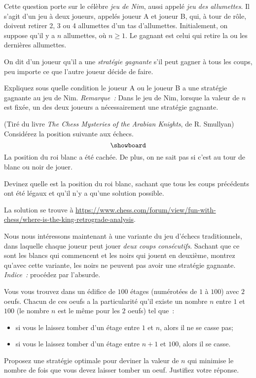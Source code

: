 \documentclass[12pt,addpoints]{exam}
\begin{document}
\begin{questions}

\question
Cette question porte sur le célèbre \emph{jeu de Nim}, aussi appelé \emph{jeu des allumettes}. Il s'agit d'un jeu à deux joueurs, appelés joueur A et joueur B, qui, à tour de rôle, doivent retirer 2, 3 ou 4 allumettes d'un tas d'allumettes. Initialement, on suppose qu'il y a $n$ allumettes, où $n \geq 1$. Le gagnant est celui qui retire la ou les dernières allumettes.

On dit d'un joueur qu'il a une \emph{stratégie gagnante} s'il peut gagner à tous les coups, peu importe ce que l'autre joueur décide de faire.

Expliquez sous quelle condition le joueur A ou le joueur B a une stratégie gagnante au jeu de Nim. \emph{Remarque~:} Dans le jeu de Nim, lorsque la valeur de $n$ est fixée, un des deux joueurs a nécessairement une stratégie gagnante.

\question
(Tiré du livre \emph{The Chess Mysteries of the Arabian Knights}, de R. Smullyan) Considérez la position suivante aux échecs.
\[ \showboard \]
La position du roi blanc a été cachée. De plus, on ne sait pas si c'est au tour de blanc ou noir de jouer.

Devinez quelle est la position du roi blanc, sachant que tous les coups précédents ont été légaux et qu'il n'y a qu'une solution possible.
\begin{solution}
La solution se trouve à \href{https://www.chess.com/forum/view/fun-with-chess/where-is-the-king-retrograde-analysis}{https://www.chess.com/forum/view/fun-with-chess/where-is-the-king-retrograde-analysis}.
\end{solution}

\question
Nous nous intéressons maintenant à une variante du jeu d'échecs traditionnels, dans laquelle chaque joueur peut jouer \emph{deux coups consécutifs}. Sachant que ce sont les blancs qui commencent et les noirs qui jouent en deuxième, montrez qu'avec cette variante, les noirs ne peuvent pas avoir une stratégie gagnante. \emph{Indice~:} procédez par l'absurde.

\question
Vous vous trouvez dans un édifice de $100$ étages (numérotées de $1$ à $100$) avec $2$ oeufs. Chacun de ces oeufs a la particularité qu'il existe un nombre $n$ entre $1$ et $100$ (le nombre $n$ est le même pour les $2$ oeufs) tel que~:
\begin{itemize}
  \item si vous le laissez tomber d'un étage entre $1$ et $n$, alors il ne se casse pas;
  \item si vous le laissez tomber d'un étage entre $n + 1$ et $100$, alors il se casse.
\end{itemize}
Proposez une stratégie optimale pour deviner la valeur de $n$ qui minimise le nombre de fois que vous devez laisser tomber un oeuf. Justifiez votre réponse.


\end{questions}
\end{document}

